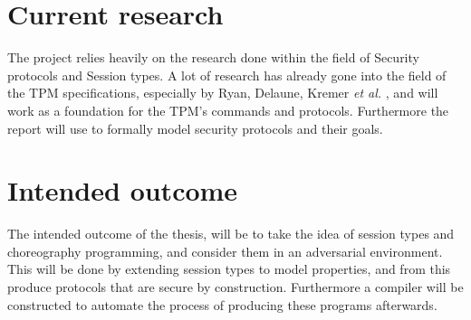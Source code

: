 
\section{Current research}
The project relies heavily on the research done within the field of Security protocols and Session types. A lot of research has already gone into the field of the TPM specifications, especially by Ryan, Delaune, Kremer \textit{et al.} \autocite{DBLP:conf/ifip1-7/DelauneKRS10}, and will work as a foundation for the TPM's commands and protocols. Furthermore the report will use \citeauthor{DBLP:journals/ftpl/CortierK14,} to formally model security protocols and their goals.

\section{Intended outcome}
The intended outcome of the thesis, will be to take the idea of session types and choreography programming, and consider them in an adversarial environment. This will be done by extending session types to model properties, and
from this produce protocols that are secure by construction. Furthermore a compiler will be constructed to automate the process of producing these programs afterwards. 